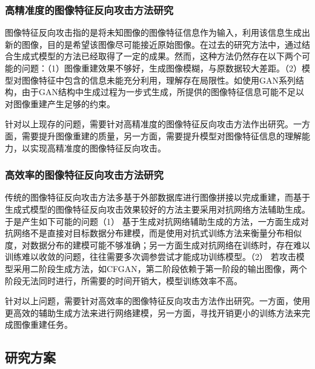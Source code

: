 \subsubsection{高精准度的图像特征反向攻击方法研究}
图像特征反向攻击指的是将未知图像的图像特征信息作为输入，利用该信息生成出新的图像，目的是希望该图像尽可能接近原始图像。在过去的研究方法中，通过结合生成式模型的方法已经取得了一定的成果。然而，这种方法仍然存在以下两个可能的问题：（1）图像重建效果不够好，生成图像模糊，与原数据较大差距。（2）模型对图像特征中包含的信息未能充分利用，理解存在局限性。如使用GAN系列结构，由于GAN结构中生成过程为一步式生成，所提供的图像特征信息可能不足以对图像重建产生足够的约束。
\par
针对以上现存的问题，需要针对高精准度的图像特征反向攻击方法作出研究。一方面，需要提升图像重建的质量，另一方面，需要提升模型对图像特征信息的理解能力，以实现高精准度的图像特征反向攻击。

\subsubsection{高效率的图像特征反向攻击方法研究}
传统的图像特征反向攻击方法多基于外部数据库进行图像拼接以完成重建，而基于生成式模型的图像特征反向攻击效果较好的方法主要采用对抗网络方法辅助生成。于是产生如下可能的问题（1） 基于生成对抗网络辅助生成的方法，一方面生成对抗网络不是直接对目标数据分布建模，而是使用对抗式训练方法来衡量分布相似度，对数据分布的建模可能不够准确；另一方面生成对抗网络在训练时，存在难以训练难以收敛的问题，往往需要多次调参尝试才能成功训练模型。（2） 若攻击模型采用二阶段生成方法，如CFGAN，第二阶段依赖于第一阶段的输出图像，两个阶段无法同时进行，所需要的时间开销大，模型训练效率不高。
\par
针对以上问题，需要针对高效率的图像特征反向攻击方法作出研究。一方面，使用更高效的辅助生成方法来进行网络建模，另一方面，寻找开销更小的训练方法来完成图像重建任务。

\subsection{研究方案}
